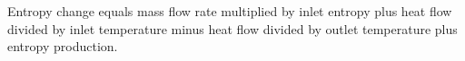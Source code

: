 Entropy change equals mass flow rate multiplied by inlet entropy plus heat flow divided by inlet temperature minus heat flow divided by outlet temperature plus entropy production.